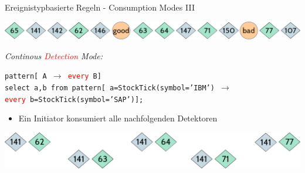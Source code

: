 \documentclass[usenames,dvipsnames]{beamer}
\begin{document}
\begin{frame}{Ereignistypbasierte Regeln - Consumption Modes III}
\begin{center}
    \includegraphics[scale=0.4]{img/stream-2}
\end{center}
\begin{exampleblock}{\textit{Continous \textcolor{red}{Detection} Mode:}}
    \begin{center}
        \texttt{pattern[  A $\rightarrow$ \textcolor{red}{every} B]}\\\vspace{0.3cm}
        \texttt{select a,b from pattern[ a=StockTick(symbol='IBM')
            $\rightarrow$\\ \textcolor{red}{every} b=StockTick(symbol='SAP')];}
    \end{center}
    \begin{itemize}
        \item Ein Initiator konsumiert alle nachfolgenden Detektoren
    \end{itemize}
\end{exampleblock}

\begin{center}
    \includegraphics[scale=0.35]{img/solution-e}
\end{center}
\end{frame}
\end{document}
